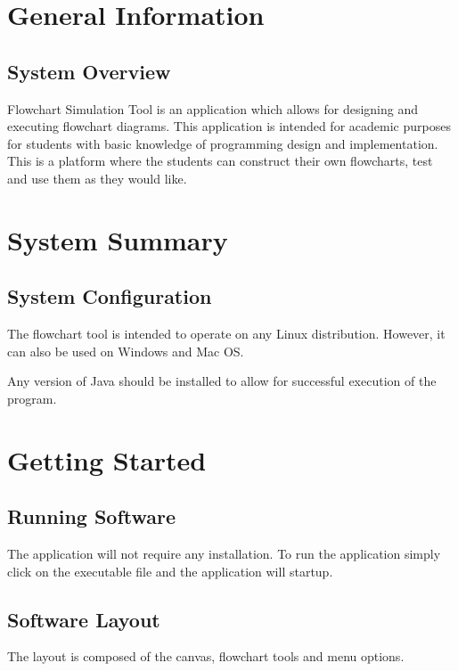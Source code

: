 \documentclass[11pt,a4paper,titlepage]{article}
\begin{document}

\newpage
\tableofcontents
{}
\newpage
{}
\section{General Information}
	\subsection{System Overview}
	
		Flowchart Simulation Tool is an application which allows for 				designing and executing flowchart diagrams. This application is 		intended for academic purposes for students with basic knowledge of 		programming design and implementation. This is a platform where the students can construct their own flowcharts, test and use them as they would like.
	
\section{System Summary}
	\subsection{System Configuration}
	
		The flowchart tool is intended to operate on any Linux 						distribution. However, it can also be used on Windows and 			Mac OS.
		
		Any version of Java should be installed to allow for successful execution of the program. 
	
\section{Getting Started}
	\subsection{Running Software}
		The application will not require any installation. To run the 			application simply click on the executable file and the 		application will startup.
		
		\subsection{Software Layout}
		The layout is composed of the canvas, flowchart tools and menu options.
		
\end{document}
